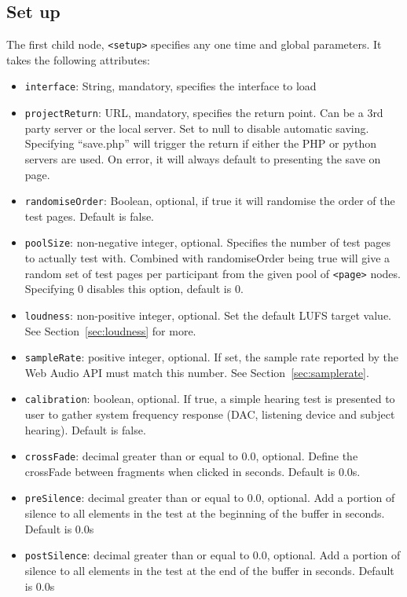 \documentclass[11pt, oneside]{article}   	%
\begin{document}
    \subsection{Set up}
        The first child node, \texttt{<setup>} specifies any one time and global parameters. It takes the following attributes:
        \begin{itemize}
            \item \texttt{interface}: String, mandatory, specifies the interface to load
            \item \texttt{projectReturn}: URL, mandatory, specifies the return point. Can be a 3rd party server or the local server. Set to null to disable automatic saving. Specifying ``save.php'' will trigger the return if either the PHP or python servers are used. On error, it will always default to presenting the save on page.
            \item \texttt{randomiseOrder}: Boolean, optional, if true it will randomise the order of the test pages. Default is false.
            \item \texttt{poolSize}: non-negative integer, optional. Specifies the number of test pages to actually test with. Combined with randomiseOrder being true will give a random set of test pages per participant from the given pool of \texttt{<page>} nodes. Specifying 0 disables this option, default is 0.
            \item \texttt{loudness}: non-positive integer, optional. Set the default LUFS target value. See Section~\ref{sec:loudness} for more.
            \item \texttt{sampleRate}: positive integer, optional. If set, the sample rate reported by the Web Audio API must match this number. See Section~\ref{sec:samplerate}.
            \item \texttt{calibration}: boolean, optional. If true, a simple hearing test is presented to user to gather system frequency response (DAC, listening device and subject hearing). Default is false.
            \item \texttt{crossFade}: decimal greater than or equal to 0.0, optional. Define the crossFade between fragments when clicked in seconds. Default is 0.0s.
            \item \texttt{preSilence}: decimal greater than or equal to 0.0, optional. Add a portion of silence to all elements in the test at the beginning of the buffer in seconds. Default is 0.0s
            \item \texttt{postSilence}: decimal greater than or equal to 0.0, optional. Add a portion of silence to all elements in the test at the end of the buffer in seconds. Default is 0.0s
        \end{itemize}
        
\end{document}
